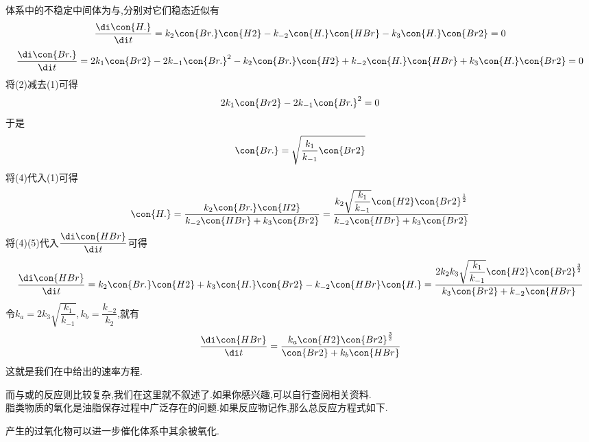 \documentclass{ctexart}
\begin{document}
\begin{derivation}\setcounter{equation}{0}
    体系中的不稳定中间体为与,分别对它们稳态近似有
    \begin{equation}
        \dfrac{\di\con{H.}}{\di t}=k_2\con{Br.}\con{H2}-k_{-2}\con{H.}\con{HBr}-k_3\con{H.}\con{Br2}=0
    \end{equation}
    \begin{equation}
        \dfrac{\di\con{Br.}}{\di t}=2k_1\con{Br2}-2k_{-1}\con{Br.}^2-k_2\con{Br.}\con{H2}+k_{-2}\con{H.}\con{HBr}+k_3\con{H.}\con{Br2}=0
    \end{equation}
    将(2)减去(1)可得
    \begin{equation}
        2k_1\con{Br2}-2k_{-1}\con{Br.}^2=0
    \end{equation}
    于是
    \begin{equation}
        \con{Br.}=\sqrt{\dfrac{k_1}{k_{-1}}\con{Br2}}
    \end{equation}
    将(4)代入(1)可得
    \begin{equation}
        \con{H.}=\dfrac{k_2\con{Br.}\con{H2}}{k_{-2}\con{HBr}+k_3\con{Br2}}=\dfrac{k_2\sqrt{\dfrac{k_1}{k_{-1}}}\con{H2}\con{Br2}^{\frac12}}{k_{-2}\con{HBr}+k_3\con{Br2}}
    \end{equation}
    将(4)(5)代入$\dfrac{\di\con{HBr}}{\di t}$可得
    \begin{equation}
        \dfrac{\di\con{HBr}}{\di t}=k_2\con{Br.}\con{H2}+k_3\con{H.}\con{Br2}-k_{-2}\con{HBr}\con{H.}=\dfrac{2k_2k_3\sqrt{\dfrac{k_1}{k_{-1}}}\con{H2}\con{Br2}^{\frac32}}{k_3\con{Br2}+k_{-2}\con{HBr}}
    \end{equation}
    令$k_a=2k_3\sqrt{\dfrac{k_1}{k_{-1}}},k_b=\dfrac{k_{-2}}{k_2}$,就有
    \begin{equation}
        \dfrac{\di\con{HBr}}{\di t}=\dfrac{k_a\con{H2}\con{Br2}^{\frac32}}{\con{Br2}+k_b\con{HBr}}
    \end{equation}
    这就是我们在中给出的速率方程.
\end{derivation}
而与或的反应则比较复杂,我们在这里就不叙述了.如果你感兴趣,可以自行查阅相关资料.\vspace{4pt}\\
\indent 脂类物质的氧化是油脂保存过程中广泛存在的问题.如果反应物记作,那么总反应方程式如下.
\begin{tightcenter}
\end{tightcenter}
产生的过氧化物可以进一步催化体系中其余被氧化.%
\end{document}
